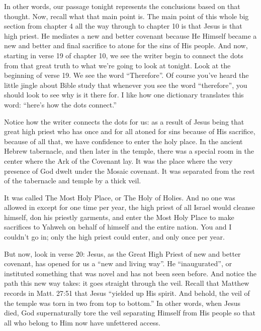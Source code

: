 \documentclass[letterpaper, 12pt]{article}
\begin{document}
    In other words, our passage tonight represents the conclusions based
    on that thought. Now, recall what that main point is. The main point
    of this whole big section from chapter 4 all the way through to
    chapter 10 is that Jesus is that high priest. He mediates a new and
    better covenant because He Himself became a new and better and final
    sacrifice to atone for the sins of His people. And now, starting in
    verse 19 of chapter 10, we see the writer begin to connect the dots
    from that great truth to what we're going to look at tonight. Look
    at the beginning of verse 19. We see the word ``Therefore''. Of
    course you've heard the little jingle about Bible study that
    whenever you see the word ``therefore'', you should look to see why
    is it there for. I like how one dictionary translates this word:
    ``here's how the dots connect.'' 

    Notice how the writer connects the dots for us: as a result of Jesus
    being that great high priest who has once and for all atoned for
    sins because of His sacrifice, because of all that, we have
    confidence to enter the holy place. In the ancient Hebrew
    tabernacle, and then later in the temple, there was a special room
    in the center where the Ark of the Covenant lay. It was the place
    where the very presence of God dwelt under the Mosaic covenant. It
    was separated from the rest of the tabernacle and temple by a thick
    veil.

    It was called The Most Holy Place, or The Holy of Holies. And no one
    was allowed in except for one time per year, the high priest of all
    Israel would cleanse himself, don his priestly garments, and enter
    the Most Holy Place to make sacrifices to Yahweh on behalf of
    himself and the entire nation. You and I couldn't go in; only the
    high priest could enter, and only once per year.

    But now, look in verse 20: Jesus, as the Great High Priest of new
    and better covenant, has opened for us a ``new and living way''. He
    ``inaugurated'', or instituted something that was novel and has not
    been seen before. And notice the path this new way takes: it goes
    straight through the veil. Recall that Matthew records in Matt.
    27:51 that Jesus ``yielded up His spirit. And behold, the veil of
    the temple was torn in two from top to bottom.'' In other words,
    when Jesus died, God supernaturally tore the veil separating Himself
    from His people so that all who belong to Him now have unfettered
    access. 
\end{document}
